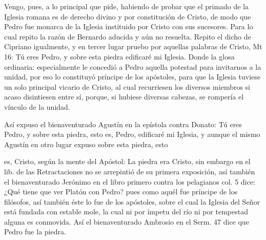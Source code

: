 Vengo, pues, a lo principal que pide, habiendo de probar que el primado de la Iglesia romana es de derecho divino y por constitución de Cristo, de modo que Pedro fue monarca de la Iglesia instituido por Cristo con sus sucesores. Para lo cual repito la razón de Bernardo aducida y aún no resuelta. Repito el dicho de Cipriano igualmente, y en tercer lugar pruebo por aquellas palabras de Cristo, Mt 16: Tú eres Pedro, y sobre esta piedra edificaré mi Iglesia. Donde la glosa ordinaria: especialmente le concedió a Pedro aquella potestad para invitarnos a la unidad, por eso lo constituyó príncipe de los apóstoles, para que la Iglesia tuviese un solo principal vicario de Cristo, al cual recurriesen los diversos miembros si acaso disintiesen entre sí, porque, si hubiese diversas cabezas, se rompería el vínculo de la unidad.

Así expuso el bienaventurado Agustín en la epístola contra Donato: Tú eres Pedro, y sobre esta piedra, esto es, Pedro, edificaré mi Iglesia, y aunque el mismo Agustín en otro lugar expuso sobre esta piedra, esto

es, Cristo, según la mente del Apóstol: La piedra era Cristo, sin embargo en el lib. de las Retractaciones no se arrepintió de su primera exposición, así también el bienaventurado Jerónimo en el libro primero contra los pelagianos col. 5 dice: ¿Qué tiene que ver Platón con Pedro? pues como aquél fue príncipe de los filósofos, así también éste lo fue de los apóstoles, sobre el cual la Iglesia del Señor está fundada con estable mole, la cual ni por ímpetu del río ni por tempestad alguna es conmovida. Así el bienaventurado Ambrosio en el Serm. 47 dice que Pedro fue la piedra.

